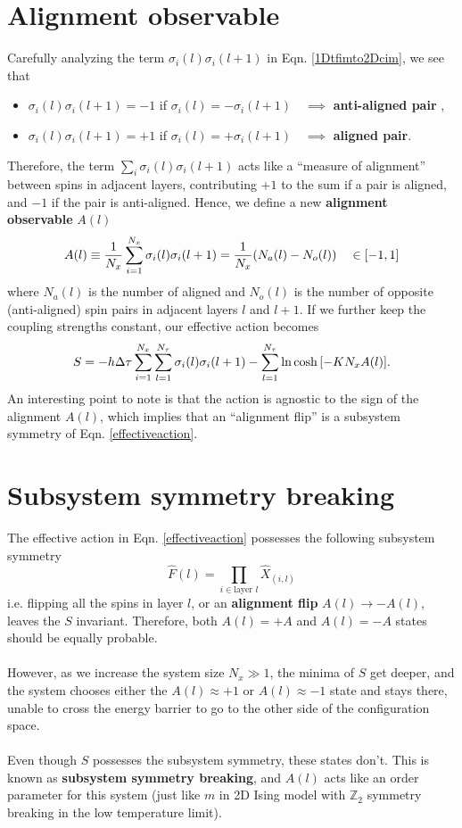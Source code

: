 \documentclass[../journal_main.tex]{subfiles}
\begin{document}
\section{Alignment observable}
Carefully analyzing the term $\sigma_i(l) \sigma_i(l+1)$ in Eqn. \eqref{1Dtfimto2Dcim}, we see that
\begin{itemize}
    \item $\sigma_i(l) \sigma_i(l+1) = -1$ if $\sigma_i(l) = - \sigma_i(l+1) \quad \implies$ \textbf{anti-aligned pair} ,
    \item $\sigma_i(l) \sigma_i(l+1) = +1$ if $\sigma_i(l) = + \sigma_i(l+1) \quad \implies$ \textbf{aligned pair}. 
\end{itemize}
Therefore, the term $\sum_i \sigma_i(l) \sigma_i(l+1)$ acts like a ``measure of alignment'' between spins in adjacent layers, contributing $+1$ to the sum if a pair is aligned, and $-1$ if the pair is anti-aligned. Hence, we define a new \textbf{alignment observable}  $A(l)$
\begin{equation}
    A(l) \equiv \frac{1}{N_x} \sum_{i=1}^{N_x} \sigma_i(l) \sigma_i(l+1) = \frac{1}{N_x}\qty(N_a(l) - N_o(l)) \quad \in [-1, 1] 
\end{equation}
where $N_a(l)$ is the number of aligned and $N_o(l)$ is the number of opposite (anti-aligned) spin pairs in adjacent layers $l$ and $l+1$. If we further keep the coupling strengths constant, our effective action becomes
\begin{equation}
    S = -h \Delta \tau  \sum_{i=1}^{N_x} \sum_{l=1}^{N_\tau} \sigma_i(l) \sigma_i(l+1) - \sum_{l=1}^{N_\tau} \ln \cosh \qty[-K N_x A(l)] .
    \label{effectiveaction}
\end{equation}
An interesting point to note is that the action is agnostic to the sign of the alignment $A(l)$, which implies that an ``alignment flip'' is a subsystem symmetry of Eqn. \eqref{effectiveaction}. 

\section{Subsystem symmetry breaking}
The effective action in Eqn. \eqref{effectiveaction} possesses the following subsystem symmetry 
\[
    \hat{F}(l) = \prod_{i \in \text{layer } l} \hat{X}_{(i,l)}
\]
i.e. flipping all the spins in layer $l$, or an \textbf{alignment flip} $A(l) \rightarrow -A(l)$,  leaves the $S$ invariant. Therefore, both $A(l) = +A$ and $A(l) = -A$ states should be equally probable. ~\\~\\
However, as we increase the system size $N_x \gg 1$, the minima of $S$ get deeper, and the system chooses either the $A(l) \approx +1$ or $A(l) \approx -1$ state and stays there, unable to cross the energy barrier to go to the other side of the configuration space.~\\~\\
Even though $S$ possesses the subsystem symmetry, these states don't. This is known as \textbf{subsystem symmetry breaking}, and $A(l)$ acts like an order parameter for this system (just like $m$ in 2D Ising model with $\mathbb{Z}_2$ symmetry breaking in the low temperature limit).
\end{document}
